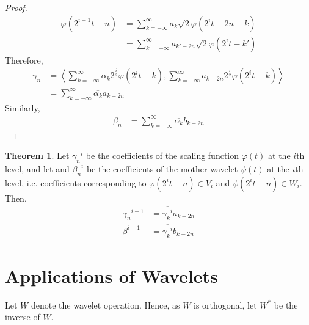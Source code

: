 \documentclass[titlepage, fleqn, a4paper, 12pt, twoside]{article}
\theoremstyle{definition}
\theoremstyle{theorem}
\newtheorem{theorem}{Theorem}
\begin{document}
\begin{proof}
\begin{align*}
		\varphi\left( 2^{i - 1} t - n \right) &= \sum\limits_{k = -\infty}^{\infty} a_k \sqrt{2} \varphi\left( 2^i t - 2 n - k \right)\\
		&= \sum\limits_{k' = -\infty}^{\infty} a_{k' - 2 n} \sqrt{2} \varphi\left( 2^i t - k' \right)
	\end{align*}
	Therefore,
	\begin{align*}
		\gamma_n &= \left\langle \sum\limits_{k = -\infty}^{\infty} \alpha_k 2^{\frac{i}{2}} \varphi\left( 2^i t - k \right) , \sum\limits_{k = -\infty}^{\infty} a_{k - 2 n} 2^{\frac{i}{2}} \varphi\left( 2^i t - k \right) \right\rangle\\
		&= \sum\limits_{k = -\infty}^{\infty} \overline{\alpha_k} a_{k - 2 n}
	\end{align*}
	Similarly,
	\begin{align*}
		\beta_n &= \sum\limits_{k = -\infty}^{\infty} \overline{\alpha_k} b_{k - 2 n}
	\end{align*}
\end{proof}

\begin{theorem}
	Let ${\gamma_n}^i$ be the coefficients of the scaling function $\varphi(t)$ at the $i$th level, and let and ${\beta_n}^i$ be the coefficients of the mother wavelet $\psi(t)$ at the $i$th level, i.e. coefficients corresponding to $\varphi\left( 2^i t - n \right) \in V_i$ and $\psi\left( 2^i t - n \right) \in W_{i}$.
	Then,
	\begin{align*}
		{\gamma_n}^{i - 1} &= \overline{{\gamma_k}^i} a_{k - 2 n}\\
		{\beta}^{i - 1} &= \overline{{\gamma_k}^i} b_{k - 2 n}
	\end{align*}
\end{theorem}

\section{Applications of Wavelets}

Let $W$ denote the wavelet operation.
Hence, as $W$ is orthogonal, let $W^*$ be the inverse of $W$.
\end{document}
